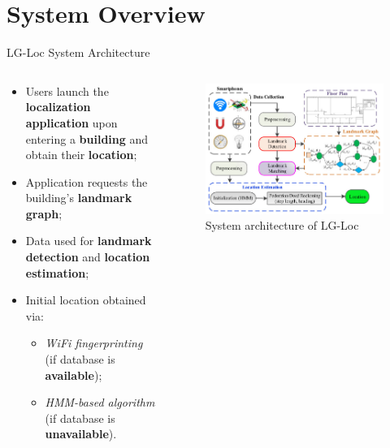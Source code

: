 \section[System]{System Overview}

\begin{frame}{LG-Loc System Architecture}
    \begin{columns}
        \begin{column}{.6\textwidth}
            \begin{itemize}
                \item Users launch the \textbf{localization application} upon entering a \textbf{building} and obtain their \textbf{location};
                \item Application requests the building's \textbf{landmark graph};
                \item Data used for \textbf{landmark detection} and \textbf{location estimation};
                \item Initial location obtained via:
                    \begin{itemize}
                        \item \textit{WiFi fingerprinting} (if database is \textbf{available});
                        \item \textit{HMM-based algorithm} (if database is \textbf{unavailable}).
                    \end{itemize}
            \end{itemize}
        \end{column}
        \begin{column}{.4\textwidth}
            \begin{figure}[t]
                \centering
                \includegraphics[width=\linewidth]{images/sys.jpg}
                \caption{System architecture of LG-Loc}
                \label{fig:sys}
            \end{figure}
        \end{column}
    \end{columns}
\end{frame}